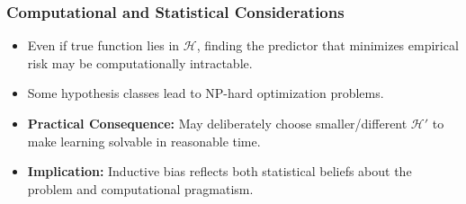 \subsubsection*{Computational and Statistical Considerations}
\begin{itemize}
    \item Even if true function lies in $\mathcal{H}$, finding the predictor that minimizes empirical risk may be computationally intractable.
    \item Some hypothesis classes lead to NP-hard optimization problems.
    \item \textbf{Practical Consequence:} May deliberately choose smaller/different $\mathcal{H}'$ to make learning solvable in reasonable time.
    \item \textbf{Implication:} Inductive bias reflects both statistical beliefs about the problem and computational pragmatism.
\end{itemize}


